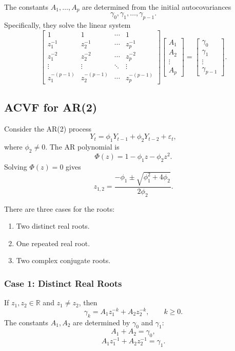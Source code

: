 \documentclass[12pt,oneside]{book}
\numberwithin{equation}{section}
\theoremstyle{definition}
\theoremstyle{plain}
\theoremstyle{remark}
\newcommand{\R}{\mathbb{R}}
\begin{document}
The constants $A_1,\ldots,A_p$ are determined from the initial autocovariances
\[
\gamma_0,\gamma_1,\ldots,\gamma_{p-1}.
\]
Specifically, they solve the linear system
\[
\begin{bmatrix}
1 & 1 & \cdots & 1 \\
z_1^{-1} & z_2^{-1} & \cdots & z_p^{-1} \\
z_1^{-2} & z_2^{-2} & \cdots & z_p^{-2} \\
\vdots & \vdots & \ddots & \vdots \\
z_1^{-(p-1)} & z_2^{-(p-1)} & \cdots & z_p^{-(p-1)}
\end{bmatrix}
\begin{bmatrix}
A_1\\
A_2\\
\vdots\\
A_p
\end{bmatrix}
=
\begin{bmatrix}
\gamma_0\\
\gamma_1\\
\vdots\\
\gamma_{p-1}
\end{bmatrix}.
\]

\subsection{ACVF for AR(2)}

Consider the AR(2) process
\[
Y_t=\phi_1Y_{t-1}+\phi_2Y_{t-2}+\varepsilon_t,
\]
where $\phi_2\neq 0$. The AR polynomial is
\[
\Phi(z)=1-\phi_1z-\phi_2z^2.
\]
Solving $\Phi(z)=0$ gives
\[
z_{1,2}
=
\frac{-\phi_1\pm\sqrt{\phi_1^2+4\phi_2}}{2\phi_2}.
\]

There are three cases for the roots:

\begin{enumerate}
\item Two distinct real roots.
\item One repeated real root.
\item Two complex conjugate roots.
\end{enumerate}

\subsubsection{Case 1: Distinct Real Roots}

If $z_1,z_2\in\R$ and $z_1\neq z_2$, then
\[
\gamma_k
=
A_1z_1^{-k}+A_2z_2^{-k},
\qquad k\geq 0.
\]
The constants $A_1,A_2$ are determined by $\gamma_0$ and $\gamma_1$:
\[
A_1+A_2=\gamma_0,
\]
\[
A_1z_1^{-1}+A_2z_2^{-1}=\gamma_1.
\]
\end{document}
